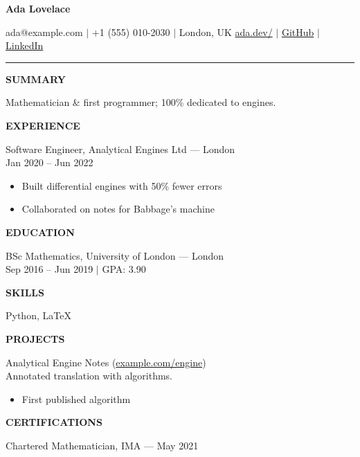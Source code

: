 \documentclass[10pt,letterpaper]{article}
\begin{document}
{\LARGE\bfseries Ada Lovelace\par}
\vspace{0.3em}
ada@example.com $|$ +1 (555) 010-2030 $|$ London, UK
\href{https://ada.dev/}{ada.dev/} $|$ \href{https://github.com/ada}{GitHub} $|$ \href{https://linkedin.com/in/ada}{LinkedIn}
\vspace{0.6em}
\hrule
\vspace{0.4em}

{\bfseries SUMMARY}\par
Mathematician \& first programmer; 100\% dedicated to engines.
\vspace{0.3em}

{\bfseries EXPERIENCE}\par
Software Engineer, Analytical Engines Ltd --- London\\
Jan 2020 -- Jun 2022
\begin{itemize}
  \item Built differential engines with 50\% fewer errors
  \item Collaborated on notes for Babbage's machine
\end{itemize}

{\bfseries EDUCATION}\par
BSc Mathematics, University of London --- London\\
Sep 2016 -- Jun 2019 $|$ GPA: 3.90

{\bfseries SKILLS}\par
Python, LaTeX

{\bfseries PROJECTS}\par
Analytical Engine Notes (\href{https://example.com/engine}{example.com/engine})\\
Annotated translation with algorithms.
\begin{itemize}
  \item First published algorithm
\end{itemize}

{\bfseries CERTIFICATIONS}\par
Chartered Mathematician, IMA --- May 2021
\end{document}
